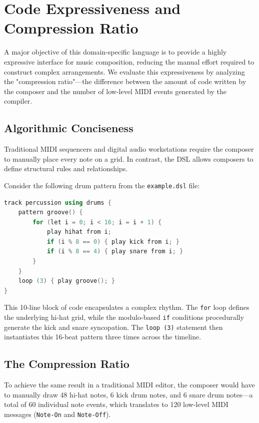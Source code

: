 \section{Code Expressiveness and Compression Ratio}\label{sec:evaluation-expressiveness}

A major objective of this domain-specific language is to provide a highly expressive interface for music
composition, reducing the manual effort required to construct complex arrangements. We evaluate this
expressiveness by analyzing the "compression ratio"—the difference between the amount of code written by the
composer and the number of low-level MIDI events generated by the compiler.

\subsection{Algorithmic Conciseness}

Traditional MIDI sequencers and digital audio workstations require the composer to manually place every note
on a grid. In contrast, the DSL allows composers to define structural rules and relationships.

Consider the following drum pattern from the \texttt{example.dsl} file:
\begin{lstlisting}[language=C++, caption={A generative drum pattern using control flow.}]
track percussion using drums {
    pattern groove() {
        for (let i = 0; i < 16; i = i + 1) {
            play hihat from i;
            if (i % 8 == 0) { play kick from i; }
            if (i % 8 == 4) { play snare from i; }
        }
    }
    loop (3) { play groove(); }
}
\end{lstlisting}

This 10-line block of code encapsulates a complex rhythm. The \texttt{for} loop defines the underlying hi-hat
grid, while the modulo-based \texttt{if} conditions procedurally generate the kick and snare syncopation. The
\texttt{loop (3)} statement then instantiates this 16-beat pattern three times across the timeline.

\subsection{The Compression Ratio}

To achieve the same result in a traditional MIDI editor, the composer would have to manually draw 48 hi-hat
notes, 6 kick drum notes, and 6 snare drum notes—a total of 60 individual note events, which translates to
120 low-level MIDI messages (\texttt{Note-On} and \texttt{Note-Off}).

